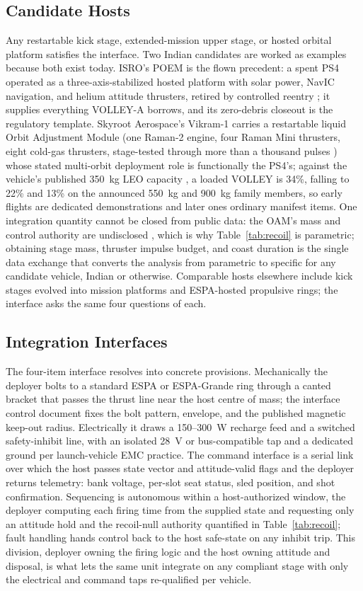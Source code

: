 \documentclass[conference]{IEEEtran}
\begin{document}
\subsection{Candidate Hosts}
Any restartable kick stage, extended-mission upper stage, or hosted orbital platform satisfies the interface. Two Indian candidates are worked as examples because both exist today. ISRO's POEM is the flown precedent: a spent PS4 operated as a three-axis-stabilized hosted platform with solar power, NavIC navigation, and helium attitude thrusters, retired by controlled reentry \cite{poem3,poem4}; it supplies everything VOLLEY-A borrows, and its zero-debris closeout is the regulatory template. Skyroot Aerospace's Vikram-1 carries a restartable liquid Orbit Adjustment Module (one Raman-2 engine, four Raman Mini thrusters, eight cold-gas thrusters, stage-tested through more than a thousand pulses \cite{oam}) whose stated multi-orbit deployment role is functionally the PS4's; against the vehicle's published 350~kg LEO capacity \cite{spacenews}, a loaded VOLLEY is 34\%, falling to 22\% and 13\% on the announced 550~kg and 900~kg family members, so early flights are dedicated demonstrations and later ones ordinary manifest items. One integration quantity cannot be closed from public data: the OAM's mass and control authority are undisclosed \cite{oam}, which is why Table~\ref{tab:recoil} is parametric; obtaining stage mass, thruster impulse budget, and coast duration is the single data exchange that converts the analysis from parametric to specific for any candidate vehicle, Indian or otherwise. Comparable hosts elsewhere include kick stages evolved into mission platforms and ESPA-hosted propulsive rings; the interface asks the same four questions of each.

\subsection{Integration Interfaces}
The four-item interface resolves into concrete provisions. Mechanically the deployer bolts to a standard ESPA or ESPA-Grande ring through a canted bracket that passes the thrust line near the host centre of mass; the interface control document fixes the bolt pattern, envelope, and the published magnetic keep-out radius. Electrically it draws a 150--300~W recharge feed and a switched safety-inhibit line, with an isolated 28~V or bus-compatible tap and a dedicated ground per launch-vehicle EMC practice. The command interface is a serial link over which the host passes state vector and attitude-valid flags and the deployer returns telemetry: bank voltage, per-slot seat status, sled position, and shot confirmation. Sequencing is autonomous within a host-authorized window, the deployer computing each firing time from the supplied state and requesting only an attitude hold and the recoil-null authority quantified in Table~\ref{tab:recoil}; fault handling hands control back to the host safe-state on any inhibit trip. This division, deployer owning the firing logic and the host owning attitude and disposal, is what lets the same unit integrate on any compliant stage with only the electrical and command taps re-qualified per vehicle.
\end{document}
